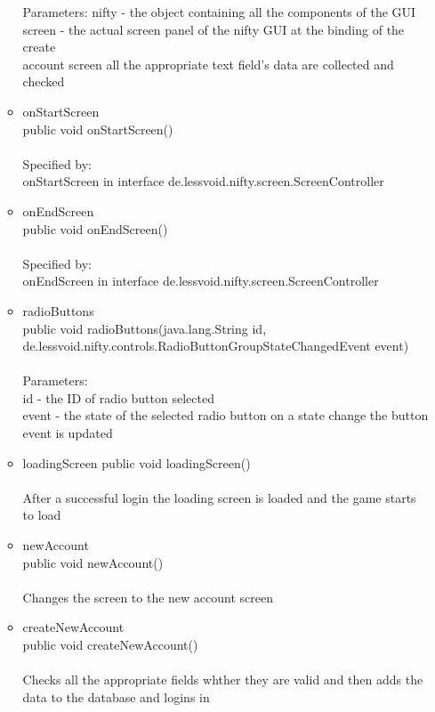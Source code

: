 \documentclass[letterpaper]{article}
\begin{document}
\begin{itemize}
\begin{itemize}
										Parameters:
										nifty - the object containing all the components of the GUI \\
										screen - the actual screen panel of the nifty GUI at the binding of the create \\ account screen all the appropriate text field's data are collected and checked
								\item	onStartScreen \\
										public void onStartScreen() \\ \\
										Specified by: \\
										onStartScreen in interface de.lessvoid.nifty.screen.ScreenController
								\item	onEndScreen \\
										public void onEndScreen() \\ \\
										Specified by: \\
										onEndScreen in interface de.lessvoid.nifty.screen.ScreenController
								\item	radioButtons \\
										public void radioButtons(java.lang.String id, de.lessvoid.nifty.controls.RadioButtonGroupStateChangedEvent event) \\ \\
										Parameters: \\
										id - the ID of radio button selected \\
										event - the state of the selected radio button on a state change the button event is updated
								\item	loadingScreen
										public void loadingScreen() \\ \\
										After a successful login the loading screen is loaded and the game starts to load
								\item	newAccount \\
										public void newAccount() \\ \\
										Changes the screen to the new account screen
								\item	createNewAccount \\
										public void createNewAccount() \\ \\
										Checks all the appropriate fields whther they are valid and then adds the data to the database and logins in

\end{itemize}
\end{itemize}
\end{document}
